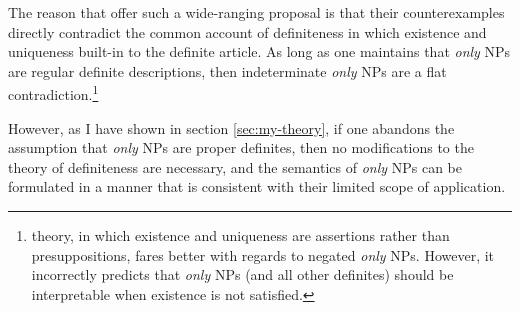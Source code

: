 The reason that \citeauthor{cb2015} offer such a wide-ranging proposal is that their counterexamples directly contradict the common account of definiteness in which existence and uniqueness built-in to the definite article. As long as one maintains that \textit{only} NPs are regular definite descriptions, then indeterminate \textit{only} NPs are a flat contradiction.\footnote{ theory, in which existence and uniqueness are assertions rather than presuppositions, fares better with regards to negated \textit{only} NPs. However, it incorrectly predicts that \textit{only} NPs (and all other definites) should be interpretable when existence is not satisfied.}

However, as I have shown in section \ref{sec:my-theory}, if one abandons the assumption that \textit{only} NPs are proper definites, then no modifications to the theory of definiteness are necessary, and the semantics of \textit{only} NPs can be formulated in a manner that is consistent with their limited scope of application.